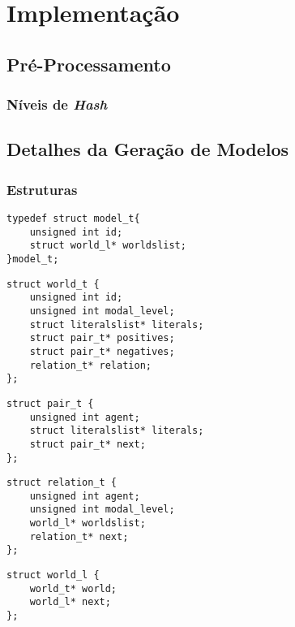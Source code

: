 \chapter{Implementação}
\label{cap:impl}

\section{Pré-Processamento}
\label{sec:pré-processamento}

\subsection{Níveis de \textit{Hash}}
\label{sub:n_veis_de_hash}


\section{Detalhes da Geração de Modelos}
\subsection{Estruturas}
\label{subsec:estruturas}


\begin{lstlisting}[frame=single]
typedef struct model_t{ 
    unsigned int id;
    struct world_l* worldslist;
}model_t;
\end{lstlisting}

\begin{lstlisting}[frame=single]
struct world_t {
    unsigned int id;
    unsigned int modal_level;
    struct literalslist* literals;
    struct pair_t* positives;
    struct pair_t* negatives;
    relation_t* relation;
};
\end{lstlisting}

\begin{lstlisting}[frame=single]
struct pair_t {
    unsigned int agent;
    struct literalslist* literals;
    struct pair_t* next;
};
\end{lstlisting}

\begin{lstlisting}[frame=single]
struct relation_t {
    unsigned int agent;
    unsigned int modal_level;
    world_l* worldslist;
    relation_t* next;
};
\end{lstlisting}

\begin{lstlisting}[frame=single]
struct world_l {
    world_t* world;
    world_l* next;
};
\end{lstlisting}

